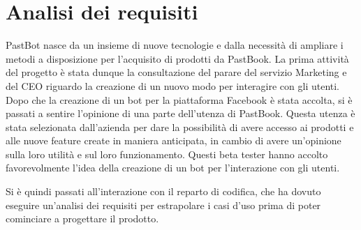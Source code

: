 
\chapter{Analisi dei requisiti}

PastBot nasce da un insieme di nuove tecnologie e dalla necessità di ampliare i
metodi a disposizione per l'acquisito di prodotti da PastBook.
La prima attività del progetto è stata dunque la consultazione del parare del
servizio Marketing e del CEO riguardo la creazione di un nuovo modo per
interagire con gli utenti. Dopo che la creazione di un bot per la piattaforma
Facebook è stata accolta, si è passati a sentire l'opinione di una parte
dell'utenza di PastBook. Questa utenza è stata selezionata dall'azienda per
dare la possibilità di avere accesso ai prodotti e alle nuove feature create in
maniera anticipata, in cambio di avere un'opinione sulla loro utilità e sul
loro funzionamento. Questi beta tester hanno accolto favorevolmente l'idea
della creazione di un bot per l'interazione con gli utenti.

Si è quindi passati all'interazione con il reparto di codifica, che ha dovuto
eseguire un'analisi dei requisiti per estrapolare i casi d'uso prima di poter
cominciare a progettare il prodotto.
